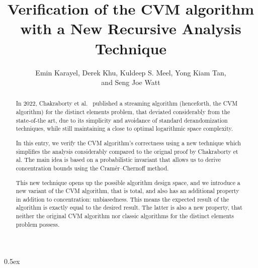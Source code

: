 \documentclass[11pt,a4paper]{article}
\theoremstyle{definition}
\begin{document}
\title{Verification of the CVM algorithm with a New Recursive Analysis Technique}
\author{Emin Karayel, Derek Khu, Kuldeep S. Meel, Yong Kiam Tan,\\and Seng Joe Watt}
\maketitle

\begin{abstract}
In 2022, Chakraborty et al.~\cite{chakraborty2022} published a streaming
algorithm (henceforth, the CVM algorithm) for the distinct
elements problem, that deviated considerably from the state-of-the art, due to its simplicity
and avoidance of standard derandomization techniques, while still maintaining a close to optimal
logarithmic space complexity.

In this entry, we verify the CVM algorithm's correctness using a new technique which simplifies
the analysis considerably compared to the orignal proof by Chakraborty et al. The main idea is
based on a probabilistic invariant that allows us to derive concentration bounds using the
Cram\'{e}r--Chernoff method.

This new technique opens up the possible algorithm design space, and we introduce a new variant of
the CVM algorithm, that is total, and also has an additional property in addition to concentration:
unbiasedness. This means the expected result of the algorithm is exactly equal to the desired
result. The latter is also a new property, that neither the original CVM algorithm nor classic
algorithms for the distinct elements problem possess.
\end{abstract}

\tableofcontents

\parindent 0pt\parskip 0.5ex






\appendix

\end{document}
